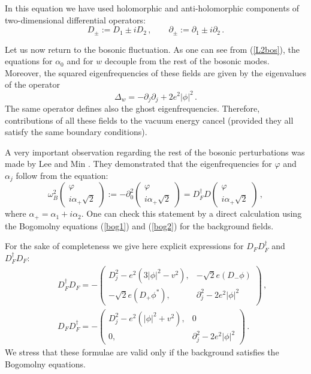 \documentclass[a4paper,12pt]{article}
\begin{document}
In this equation we have used holomorphic and anti-holomorphic
components of two-dimensional differential operators:
\begin{equation}
D_\pm := D_1\pm i D_2\,,\qquad 
\partial_\pm :=\partial_1\pm i \partial_2 \,.\label{Ddpm}
\end{equation}

Let us now return to the bosonic fluctuation. As one can see from
(\ref{L2bos}), the equations for $\alpha_0$ and for $w$ decouple
from the rest of the bosonic modes. Moreover, the squared 
eigenfrequencies of these fields are given by the eigenvalues of
the operator
\begin{equation}
\Delta_w=-\partial_j\partial_j +2e^2|\phi |^2 \,.\label{opwa0}
\end{equation}
The same operator defines also the ghost eigenfrequencies.
Therefore, contributions of all these fields to the vacuum energy
cancel (provided they all satisfy the same boundary conditions).

A very important observation regarding the rest of the bosonic
perturbations was made by Lee and Min \cite{Lee:1994pm}.
They demonstrated that the eigenfrequencies for $\varphi$ and
$\alpha_j$ follow from the equation:
\begin{equation}
\omega_B^2 
\left( \begin{array}{c} \varphi \\ {i\alpha_+}{\sqrt{2}} \end{array} \right)
:= -\partial_0^2
\left( \begin{array}{c} \varphi \\ {i\alpha_+}{\sqrt{2}} \end{array} \right)
= D_F^\dag D 
\left( \begin{array}{c} \varphi \\ {i\alpha_+}{\sqrt{2}} \end{array} \right)\,,
\label{omB}
\end{equation}
where $\alpha_+=\alpha_1+i\alpha_2$.
One can check this statement by a direct calculation using the
Bogomolny equations (\ref{bog1}) and (\ref{bog2}) for the background fields.

For the sake of completeness we give here explicit expressions for
$D_FD_F^\dag$ and $D_F^\dag D_F$:
\begin{eqnarray}
&&D_F^\dag D_F = -\left( \begin{array}{cc} D_j^2 - e^2 (3|\phi |^2
-v^2 ), &  -\sqrt{2} e (D_-\phi ) \\
-\sqrt{2} e (D_+\phi^*), & \partial_j^2 -2e^2 |\phi |^2
\end{array} \right) \label{DdagD}\,,\\
&&D_F D_F^\dag = -\left( \begin{array}{cc}D_j^2 - e^2 (|\phi |^2
+v^2 ), & 0 \\ 0, & \partial_j^2 -2e^2 |\phi |^2
\end{array} \right)\,.\label{DDdag}
\end{eqnarray}
We stress that these formulae are valid only if the background
satisfies the Bogomolny equations.
\end{document}
